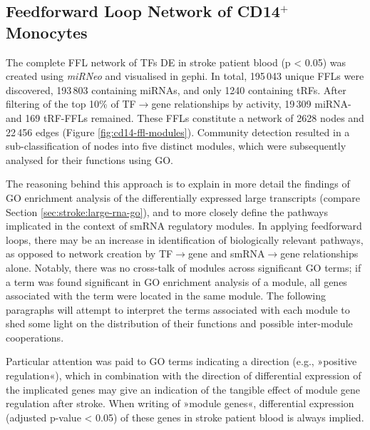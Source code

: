 \subsection{Feedforward Loop Network of CD14$^+$ Monocytes} \label{sec:stroke:ffl-cd14}
The complete FFL network of TFs DE in stroke patient blood (p < 0.05) was created using \emph{miRNeo} and visualised in gephi. In total, 195\,043 unique FFLs were discovered, 193\,803 containing miRNAs, and only 1240 containing tRFs. After filtering of the top 10\% of TF$\to$gene relationships by activity, 19\,309 miRNA- and 169 tRF-FFLs remained. These FFLs constitute a network of 2628 nodes and 22\,456 edges (Figure \ref{fig:cd14-ffl-modules}). Community detection\cite{Blondel2008} resulted in a sub-classification of nodes into five distinct modules, which were subsequently analysed for their functions using GO.

The reasoning behind this approach is to explain in more detail the findings of GO enrichment analysis of the differentially expressed large transcripts (compare Section \ref{sec:stroke:large-rna-go}), and to more closely define the pathways implicated in the context of smRNA regulatory modules. In applying feedforward loops, there may be an increase in identification of biologically relevant pathways, as opposed to network creation by TF$\to$gene and smRNA$\to$gene relationships alone. Notably, there was no cross-talk of modules across significant GO terms; if a term was found significant in GO enrichment analysis of a module, all genes associated with the term were located in the same module. The following paragraphs will attempt to interpret the terms associated with each module to shed some light on the distribution of their functions and possible inter-module cooperations.

Particular attention was paid to GO terms indicating a direction (e.g., »positive regulation«), which in combination with the direction of differential expression of the implicated genes may give an indication of the tangible effect of module gene regulation after stroke. When writing of »module genes«, differential expression (adjusted p-value < 0.05) of these genes in stroke patient blood is always implied.

